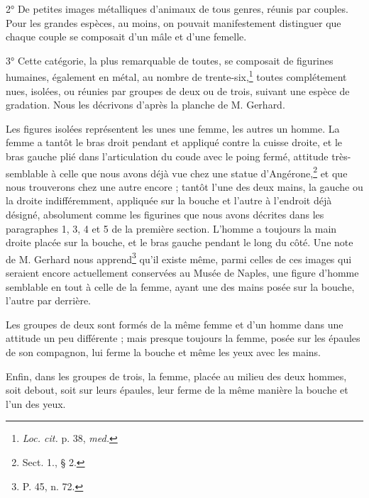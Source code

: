 \documentclass[a4paper, 11pt, oneside, polutonikogreek, french]{article}
\begin{document}
2° De petites images métalliques d'animaux de tous genres, réunis par couples. Pour les grandes espèces, au moins, on pouvait manifestement distinguer que chaque couple se composait d'un mâle et d'une femelle.

3° Cette catégorie, la plus remarquable de toutes, se composait de figurines humaines, également en métal, au nombre de trente-six,\footnote{\emph{Loc. cit.} p. 38, \emph{med.}} toutes complétement nues, isolées, ou réunies par groupes de deux ou de trois, suivant une espèce de gradation. Nous les décrivons d'après la planche de M. Gerhard.

Les figures isolées représentent les unes une femme, les autres un homme. La femme a tantôt le bras droit pendant et appliqué contre la cuisse droite, et le bras gauche plié dans l'articulation du coude avec le poing fermé, attitude très-semblable à celle que nous avons déjà vue chez une statue d'Angérone,\footnote{Sect. 1., § 2.} et que nous trouverons chez une autre encore ; tantôt l'une des deux mains, la gauche ou la droite indifféremment, appliquée sur la bouche et l'autre à l'endroit déjà désigné, absolument comme les figurines que nous avons décrites dans les paragraphes 1, 3, 4 et 5 de la première section. L'homme a toujours la main droite placée sur la bouche, et le bras gauche pendant le long du côté. Une note de M. Gerhard nous apprend\footnote{P. 45, n. 72.} qu'il existe même, parmi celles de ces images qui seraient encore actuellement conservées au Musée de Naples, une figure d'homme semblable en tout à celle de la femme, ayant une des mains posée sur la bouche, l'autre par derrière.

Les groupes de deux sont formés de la même femme et d'un homme dans une attitude un peu différente ; mais presque toujours la femme, posée sur les épaules de son compagnon, lui ferme la bouche et même les yeux avec les mains.

Enfin, dans les groupes de trois, la femme, placée au milieu des deux hommes, soit debout, soit sur leurs épaules, leur ferme de la même manière la bouche et l'un des yeux.
\end{document}
